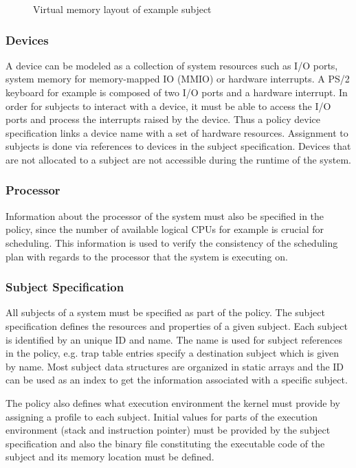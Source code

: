 \begin{figure}[h]
	\centering
	
	\caption{Virtual memory layout of example subject}
	\label{fig:virt-mem-layout-example}
\end{figure}

\subsubsection{Devices}
A device can be modeled as a collection of system resources such as I/O ports,
system memory for memory-mapped IO (MMIO) or hardware interrupts. A PS/2
keyboard for example is composed of two I/O ports and a hardware interrupt.  In
order for subjects to interact with a device, it must be able to access the I/O
ports and process the interrupts raised by the device. Thus a policy device
specification links a device name with a set of hardware resources. Assignment
to subjects is done via references to devices in the subject specification.
Devices that are not allocated to a subject are not accessible during the
runtime of the system.

\subsubsection{Processor}
Information about the processor of the system must also be specified in the
policy, since the number of available logical CPUs for example is crucial for
scheduling. This information is used to verify the consistency of the scheduling
plan with regards to the processor that the system is executing on.

\subsubsection{Subject Specification}
All subjects of a system must be specified as part of the policy. The subject
specification defines the resources and properties of a given subject. Each
subject is identified by an unique ID and name. The name is used for subject
references in the policy, e.g. trap table entries specify a destination subject
which is given by name. Most subject data structures are organized in static
arrays and the ID can be used as an index to get the information associated
with a specific subject.

The policy also defines what execution environment the kernel must provide by
assigning a profile to each subject. Initial values for parts of the execution
environment (stack and instruction pointer) must be provided by the subject
specification and also the binary file constituting the executable code of the
subject and its memory location must be defined.

